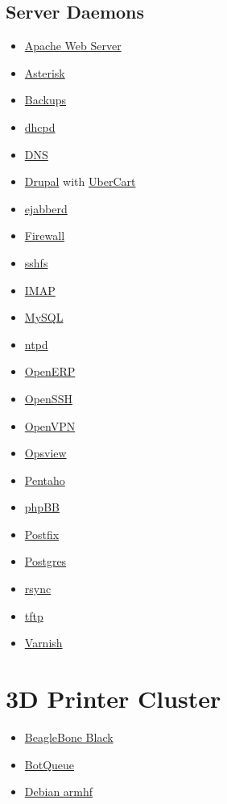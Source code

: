 \subsection{Server Daemons}
\begin{itemize}
\item \href{http://httpd.apache.org/}{Apache Web Server}
\item \href{http://www.asterisk.org}{Asterisk}
\item \href{https://github.com/tummy-dot-com/tummy-backup}{Backups}
\item \href{http://dnsmasq.org/}{dhcpd}
\item \href{http://dnsmasq.org/}{DNS}
\item \href{http://www.drupal.org}{Drupal} with \href{http://www.ubercart.org/}{UberCart}
\item \href{http://www.ejabberd.im/}{ejabberd}
\item \href{http://www.openbsd.org/faq/pf/}{Firewall}
\item \href{http://fuse.sourceforge.net/sshfs.html}{sshfs}
\item \href{http://dovecot.org/}{IMAP}
\item \href{http://www.mysql.org/}{MySQL}
\item \href{http://support.ntp.org/}{ntpd}
\item \href{http://www.openerp.org/}{OpenERP}
\item \href{http://www.openssh.com/}{OpenSSH}
\item \href{http://openvpn.net/}{OpenVPN}
\item \href{http://www.opsview.com/}{Opsview}
\item \href{http://community.pentaho.com/}{Pentaho}
\item \href{https://www.phpbb.com/}{phpBB}
\item \href{http://www.postfix.org/}{Postfix}
\item \href{http://www.postgresql.org/}{Postgres}
\item \href{http://rsync.samba.org/}{rsync}
\item \href{http://dnsmasq.org/}{tftp}
\item \href{https://www.varnish-cache.org/}{Varnish}
\end{itemize}

\section{3D Printer Cluster}
\begin{itemize}
\item \href{http://beagleboard.org/}{BeagleBone Black}
\item \href{http://botqueue.org/}{BotQueue}
\item \href{https://wiki.debian.org/ArmHardFloatPort}{Debian armhf}
\end{itemize}

